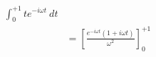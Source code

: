 \documentclass[preview]{standalone}
\begin{document}
\begin{align*}
\int_{0}^{+1}t e^{-i\omega t} \ dt \\&=\left[\frac{e^{-i\omega t}(1+i\omega t)}{\omega^{2}}\right]_{0}^{+1} \\
\end{align*}
\end{document}
